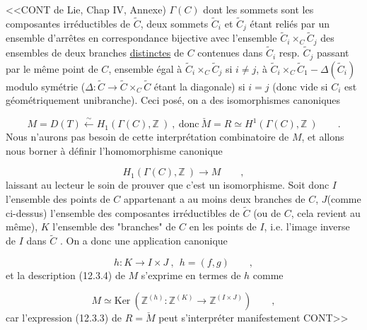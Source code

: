 <<CONT de Lie, Chap IV, Annexe) $\Gamma(C)$ dont les sommets sont les composantes irréductibles de $\widetilde{C}$, deux sommets $\widetilde{C}_i$ et $\widetilde{C}_j$ étant reliés par un ensemble d'arrêtes en correspondance bijective avec l'ensemble $\widetilde{C}_i \times_C \widetilde{C}_j$ des ensembles de deux branches \underline{distinctes} de $C$ contenues dans $\widetilde{C}_i$ resp. $\widetilde{C}_j$ passant par le même point de $C$, ensemble égal à $\widetilde{C}_i \times_C \widetilde{C}_j$ si $i \neq j$, à $\widetilde{C}_i \times_C \widetilde{C}_1 - \Delta(\widetilde{C}_i)$ modulo symétrie ($\Delta : \widetilde{C} \longrightarrow \widetilde{C} \times_C \widetilde{C}$ étant la diagonale) si $i=j$ (donc vide si $C_i$ est géométriquement unibranche). Ceci posé, on a des isomorphismes canoniques

\begin{equation}\tag{12.3.7}
M = D(T) \stackrel{\sim}{\longleftarrow} H_1(\Gamma(C),\mathbb{Z}\ )\ ,\ \mbox{donc}\ \check{M} = R \simeq H^{1}(\Gamma(C),\mathbb{Z}\ )\qquad .
\end{equation}
Nous n'aurons pas besoin de cette interprétation combinatoire de $M$, et allons nous borner à définir l'homomorphisme canonique

\begin{equation*}
H_1(\Gamma(C),\mathbb{Z}\ ) \longrightarrow M \qquad ,
\end{equation*}
laissant au lecteur le soin de prouver que c'est un isomorphisme. Soit donc $I$ l'ensemble des points de $C$ appartenant a au moins deux branches de $C$, $J$(comme ci-dessus) l'ensemble des composantes irréductibles de $\widetilde{C}$ (ou de $C$, cela revient au même), $K$ l'ensemble des "branches" de $C$ en les points de $I$, i.e. l'image inverse de $I$ dans $\widetilde{C}$ . On a donc une application canonique

\begin{equation}\tag{12.3.9}
h : K \longrightarrow I \times J\ ,\ \ h = (f,g)\qquad ,
\end{equation}
et la description (12.3.4) de $M$ s'exprime en termes de $h$ comme

\begin{equation}\tag{12.3.10}
M \simeq \mathrm{Ker}\ (\mathbb{Z}^{(h)} : \mathbb{Z}^{(K)} \longrightarrow \mathbb{Z}^{(I \times J)})\qquad ,
\end{equation}
car l'expression (12.3.3) de $R = \check{M}$ peut s'interpréter manifestement CONT>>



